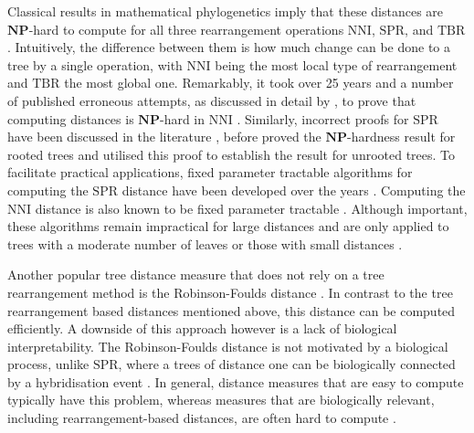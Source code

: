 \documentclass[11pt]{amsart}
\newcommand{\nni}{\mathrm{NNI}}
\newcommand{\spr}{\mathrm{SPR}}
\newcommand{\tbr}{\mathrm{TBR}}
\newcommand{\np}{\mathbf{NP}}
\begin{document}
Classical results in mathematical phylogenetics imply that these distances are $\np$-hard to compute for all three rearrangement operations $\nni$, $\spr$, and $\tbr$ \autocite{Dasgupta2000-xa, Bordewich2005-nx, Hickey2008-wv, Allen2001-ky}.
Intuitively, the difference between them is how much change can be done to a tree by a single operation, with $\nni$ being the most local type of rearrangement and $\tbr$ the most global one.
Remarkably, it took over 25 years and a number of published erroneous attempts, as discussed in detail by \textcite{Dasgupta2000-xa}, to prove that computing distances is $\np$-hard in $\nni$ \autocite{Dasgupta2000-xa}.
Similarly, incorrect proofs for $\spr$ have been discussed in the literature \autocite{Hein1996-em, Allen2001-ky}, before \textcite{Bordewich2005-nx} proved the $\np$-hardness result for rooted trees and \textcite{Hickey2008-wv} utilised this proof to establish the result for unrooted trees.
To facilitate practical applications, fixed parameter tractable algorithms \autocite{Downey2013-nd} for computing the $\spr$ distance have been developed over the years \autocite{Whidden2010-bw, Bordewich2005-nx, Whidden2018-fw}.
Computing the $\nni$ distance is also known to be fixed parameter tractable \autocite{DasGupta1999-xf}.
Although important, these algorithms remain impractical for large distances and are only applied to trees with a moderate number of leaves or those with small distances \autocite{Whidden2018-fw}.

Another popular tree distance measure that does not rely on a tree rearrangement method is the Robinson-Foulds distance \autocite{Robinson1981-fb}.
In contrast to the tree rearrangement based distances mentioned above, this distance can be computed efficiently.
A downside of this approach however is a lack of biological interpretability.
The Robinson-Foulds distance is not motivated by a biological process, unlike $\spr$, where a trees of distance one can be biologically connected by a hybridisation event \autocite{Bordewich2005-nx}.
In general, distance measures that are easy to compute typically have this problem, whereas measures that are biologically relevant, including rearrangement-based distances, are often hard to compute \autocite{Whidden2018-fw}.
\end{document}
